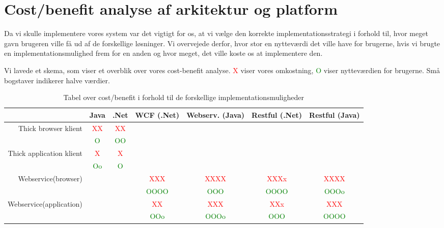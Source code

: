 \section{Cost/benefit analyse af arkitektur og platform}
\label{Technical_CostBen}
Da vi skulle implementere vores system var det vigtigt for os, at vi vælge den korrekte implementationsstrategi i forhold til, hvor meget gavn brugeren ville få ud af de forskellige løsninger. Vi overvejede derfor, hvor stor en nytteværdi det ville have for brugerne, hvis vi brugte en implementationsmulighed frem for en anden og hvor meget, det ville koste os at implementere den. 

Vi lavede et skema, som viser et overblik over vores cost-benefit analyse. \textcolor{red}{X} viser vores omkostning, \textcolor{Green}{O} viser nytteværdien for brugerne. Små bogstaver indikerer halve værdier.

\begin{table}[h]
\begin{centering}
\begin{tabular}{| r | c | c | c | c | c | c |}
\hline
 & Java & .Net & WCF (.Net) & Webserv. (Java) & Restful (.Net) & Restful (Java)\\
\hline
Thick browser klient & \textcolor{red}{XX} & \textcolor{red}{XX} & & & & \\ \cline{2-3}
 & \textcolor{Green}{O} & \textcolor{Green}{OO} & & & & \\
\hline
Thick application klient & \textcolor{red}{X} & \textcolor{red}{X} & & & & \\ \cline{2-3}
 & \textcolor{Green}{Oo} & \textcolor{Green}{O} & & & & \\
\hline
Webservice(browser) & & & \textcolor{red}{XXX} & \textcolor{red}{XXXX} & \textcolor{red}{XXXx} & \textcolor{red}{XXXX} \\ \cline{4-7}
 & & & \textcolor{Green}{OOOO} & \textcolor{Green}{OOO} & \textcolor{Green}{OOOO} & \textcolor{Green}{OOOo}\\
\hline
Webservice(application) & & & \textcolor{red}{XX} & \textcolor{red}{XXX} & \textcolor{red}{XXx} & \textcolor{red}{XXX} \\ \cline{4-7}
 & & & \textcolor{Green}{OOo} & \textcolor{Green}{OOOo} & \textcolor{Green}{OOO} & \textcolor{Green}{OOOO}\\
\hline
\end{tabular}
\end{centering}
\caption{Tabel over cost/benefit i forhold til de forskellige implementationsmuligheder}
\label{fig:Technical_CostBen_Table}
\end{table}


